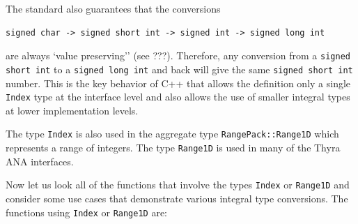 \documentclass[pdf,ps2pdf,11pt]{SANDreport}
\begin{document}
The standard also guarantees that the conversions
%
{\scriptsize\begin{verbatim}
signed char -> signed short int -> signed int -> signed long int
\end{verbatim}}
%
{}\noindent{}are always `value preserving'' (see ???).  Therefore, any
conversion from a {}\texttt{signed short int} to a {}\texttt{signed long int}
and back will give the same {}\texttt{signed short int} number.  This is the
key behavior of C++ that allows the definition only a single {}\texttt{Index}
type at the interface level and also allows the use of smaller integral types
at lower implementation levels.

The type {}\texttt{Index} is also used in the aggregate type
{}\texttt{Range\-Pack\-::Range1D} which represents a range of integers.  The
type {}\texttt{Range1D} is used in many of the Thyra ANA interfaces.

Now let us look all of the functions that involve the types {}\texttt{Index}
or {}\texttt{Range1D} and consider some use cases that demonstrate various
integral type conversions.  The functions using {}\texttt{Index} or
{}\texttt{Range1D} are:
\end{document}
